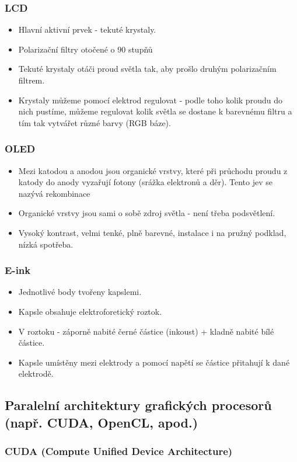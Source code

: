 \documentclass[10pt,a4paper]{article}
\begin{document}
\subsubsection{LCD}
\begin{itemize}
\item Hlavní aktivní prvek - tekuté krystaly.
\item Polarizační filtry otočené o 90 stupňů
\item Tekuté krystaly otáči proud světla tak, aby prošlo druhým polarizačním filtrem.
\item Krystaly můžeme pomocí elektrod regulovat - podle toho kolik proudu do nich pustíme, můžeme regulovat kolik světla se dostane k barevnému filtru a tím tak vytvářet různé barvy (RGB báze).
\end{itemize}

\subsubsection{OLED}
\begin{itemize}
\item Mezi katodou a anodou jsou organické vrstvy, které při průchodu proudu z katody do anody vyzařují fotony (srážka elektronů a děr). Tento jev se nazývá rekombinace
\item Organické vrstvy jsou sami o sobě zdroj světla - není třeba podsvětlení.
\item Vysoký kontrast, velmi tenké, plně barevné, instalace i na pružný podklad, nízká spotřeba.
\end{itemize}
\subsubsection{E-ink}
\begin{itemize}
\item Jednotlivé body tvořeny kapslemi.
\item Kapsle obsahuje elektroforetický roztok.
\item V roztoku - záporně nabité černé částice (inkoust) + kladně nabité bílé částice.
\item Kapsle umístěny mezi elektrody a pomocí napětí se částice přitahují k dané elektrodě.
\end{itemize}
\subsection{Paralelní architektury grafických procesorů (např. CUDA, OpenCL, apod.)}
\subsubsection{CUDA (Compute Unified Device Architecture)}
\end{document}
